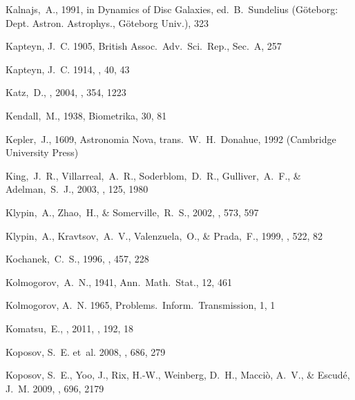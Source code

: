\begin{thebibliography}{99}
  Kalnajs,~A., 1991, in Dynamics of Disc Galaxies, ed.~B.~Sundelius (G\"{o}teborg: Dept. Astron. Astrophys., G\"{o}teborg Univ.), 323

{Kapteyn}, J.~C. 1905, {British Assoc.~Adv.~Sci.~Rep.}, Sec.~A, 257

{Kapteyn}, J.~C. 1914, \apj, 40, 43

  Katz,~D., \etal, 2004,
\mnras, 354, 1223

  Kendall,~M., 1938,
  Biometrika, 30, 81

  Kepler,~J., 1609,
  Astronomia Nova,
  trans.\ W.~H.~Donahue, 1992
  (Cambridge University Press)

  King,~J.~R., Villarreal,~A.~R., Soderblom,~D.~R., Gulliver,~A.~F., \& Adelman,~S.~J., 2003,
  \aj, 125, 1980

  Klypin,~A., Zhao,~H., \& Somerville,~R.~S., 2002,
  \apj, 573, 597

  Klypin,~A., Kravtsov,~A.~V., Valenzuela,~O., \& Prada,~F., 1999, \apj, 522, 82

  Kochanek,~C.~S., 1996,
  \apj, 457, 228

  Kolmogorov,~A.~N., 1941,
  Ann.~Math.~Stat., 12, 461

{Kolmogorov}, A.~N. 1965, {Problems.~Inform.~Transmission}, 1, 1

  Komatsu,~E., \etal, 2011, \apjs, 192, 18

{Koposov}, S.~E. {et~al.} 2008, \apj, 686, 279

{Koposov}, S.~E., {Yoo}, J., {Rix}, H.-W., {Weinberg}, D.~H., {Macci{\`o}},
  A.~V., \& {Escud{\'e}}, J.~M. 2009, \apj, 696, 2179


\end{thebibliography}
